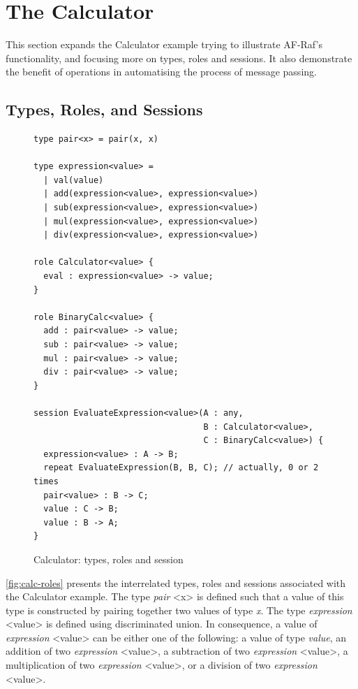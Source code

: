 \documentclass[a4paper,12pt,oneside,fleqn]{book} %
\begin{document}
\section{The Calculator} %

This section expands the Calculator example trying to illustrate AF-Raf's
functionality, and focusing more on types, roles and sessions. It also
demonstrate the benefit of operations in automatising the process of
message passing.

\subsection{Types, Roles, and Sessions} %
\begin{figure}\footnotesize %
\begin{verbatim}
type pair<x> = pair(x, x)

type expression<value> =
  | val(value)
  | add(expression<value>, expression<value>)
  | sub(expression<value>, expression<value>)
  | mul(expression<value>, expression<value>)
  | div(expression<value>, expression<value>)

role Calculator<value> {
  eval : expression<value> -> value;
}

role BinaryCalc<value> {
  add : pair<value> -> value;
  sub : pair<value> -> value;
  mul : pair<value> -> value;
  div : pair<value> -> value;
}

session EvaluateExpression<value>(A : any,
                                  B : Calculator<value>,
                                  C : BinaryCalc<value>) {
  expression<value> : A -> B;
  repeat EvaluateExpression(B, B, C); // actually, 0 or 2 times
  pair<value> : B -> C;
  value : C -> B;
  value : B -> A;
}
\end{verbatim}
\caption{Calculator: types, roles and session}
\label{fig:calc-roles}
\end{figure} %

\autoref{fig:calc-roles} presents the interrelated types, roles and
sessions associated with the Calculator example. The type \textit{pair} <x>
is defined such that a value of this type is constructed by pairing
together two values of type \textit{x}. The type \textit{expression}
<value> is defined using discriminated union. In consequence, a value of
\textit{expression} <value> can be either one of the following: a value of
type \textit{value}, an addition of two \textit{expression} <value>, a
subtraction of two \textit{expression} <value>, a multiplication of two
\textit{expression} <value>, or a division of two \textit{expression}
<value>.
\end{document}
